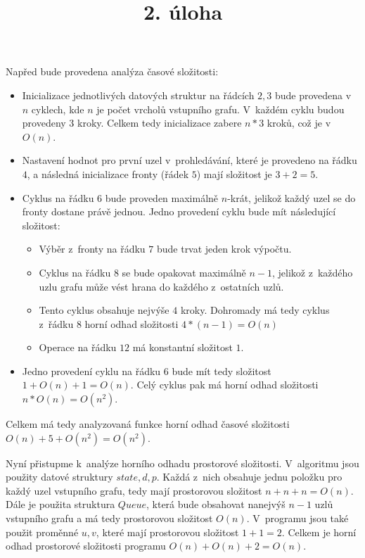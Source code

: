 \documentclass[a4paper]{article}
\title {2. úloha}
\begin{document}
\section*{}
Napřed bude provedena analýza časové složitosti:
\begin{itemize}
    \item Inicializace jednotlivých datových struktur na řádcích $2,3$ bude provedena v~$n$ cyklech, kde $n$ je počet vrcholů vstupního grafu.
    V~každém cyklu budou provedeny $3$ kroky.
    Celkem tedy inicializace zabere $n*3$ kroků, což je v~$O(n)$.
    \item Nastavení hodnot pro první uzel v~prohledávání, které je provedeno na řádku $4$, a následná inicializace fronty (řádek $5$) mají
    složitost je $3+2=5$.
    \item Cyklus na řádku $6$ bude proveden maximálně $n$-krát, jelikož každý uzel se do fronty dostane právě jednou.
    Jedno provedení cyklu bude mít následující složitost:
    \begin{itemize}
        \item Výběr z~fronty na řádku $7$ bude trvat jeden krok výpočtu.
        \item Cyklus na řádku $8$ se bude opakovat maximálně $n-1$, jelikož z~každého uzlu grafu může vést hrana do každého z~ostatních uzlů.
        \item Tento cyklus obsahuje nejvýše $4$ kroky.
        Dohromady má tedy cyklus z~řádku $8$ horní odhad složitosti $4*(n-1)=O(n)$
        \item Operace na řádku $12$ má konstantní složitost $1$.
    \end{itemize}
    \item Jedno provedení cyklu na řádku $6$ bude mít tedy složitost $1+O(n)+1=O(n)$.
    Celý cyklus pak má horní odhad složitosti $n*O(n)=O(n^2)$.
\end{itemize}
Celkem má tedy analyzovaná funkce horní odhad časové složitosti $O(n)+5+O(n^2)=O(n^2)$.

Nyní přistupme k~analýze horního odhadu prostorové složitosti.
V~algoritmu jsou použity datové struktury $state, d, p$.
Každá z~nich obsahuje jednu položku pro každý uzel vstupního grafu, tedy mají prostorovou složitost $n+n+n=O(n)$.
Dále je použita struktura $Queue$, která bude obsahovat nanejvýš $n-1$ uzlů vstupního grafu a má tedy prostorovou složitost $O(n)$.
V~programu jsou také použit proměnné $u,v$, které mají prostorovou složitost $1+1=2$.
Celkem je horní odhad prostorové složitosti programu $O(n)+O(n)+2=O(n)$.
\end{document}
